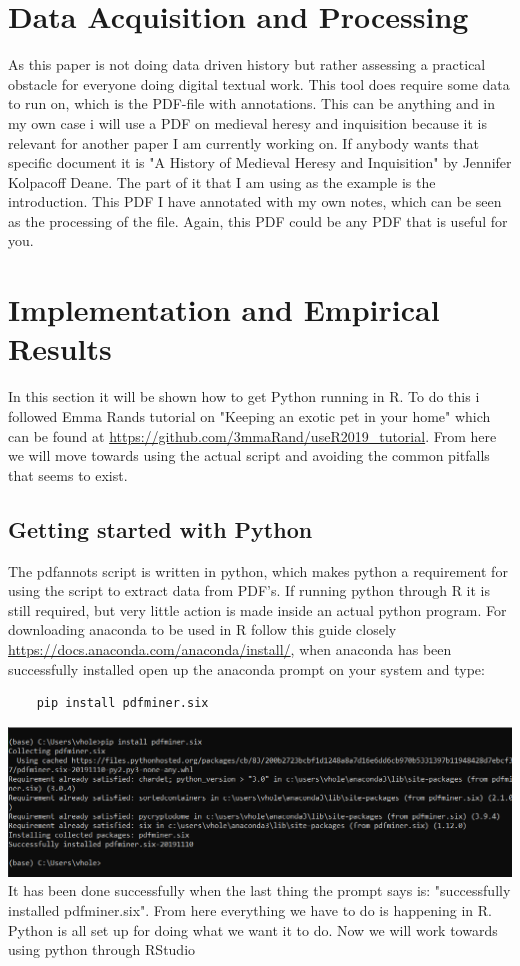 \documentclass{article}
\begin{document}
\section{Data Acquisition and Processing}
As this paper is not doing data driven history but rather assessing a practical obstacle for everyone doing digital textual work. This tool does require some data to run on, which is the PDF-file with annotations. This can be anything and in my own case i will use a PDF on medieval heresy and inquisition because it is relevant for another paper I am currently working on. If anybody wants that specific document it is "A History of Medieval Heresy and Inquisition" by Jennifer Kolpacoff Deane. The part of it that I am using as the example is the introduction. This PDF I have annotated with my own notes, which can be seen as the processing of the file. Again, this PDF could be any PDF that is useful for you.

\section{Implementation and Empirical Results}
In this section it will be shown how to get Python running in R. To do this i followed Emma Rands tutorial on "Keeping an exotic pet in your home" which can be found at \url{https://github.com/3mmaRand/useR2019_tutorial}. From here we will move towards using the actual script and avoiding the common pitfalls that seems to exist.  
\subsection{Getting started with Python}
The pdfannots script is written in python, which makes python a requirement for using the script to extract data from PDF’s. If running python through R it is still required, but very little action is made inside an actual python program. For downloading anaconda to be used in R follow this guide closely \url{https://docs.anaconda.com/anaconda/install/}, when anaconda has been successfully installed open up the anaconda prompt on your system and type: 
\begin{verbatim}
    pip install pdfminer.six
\end{verbatim}
\includegraphics[scale=0.53]{Install_pdfminer_six.PNG}\newline
It has been done successfully when the last thing the prompt says is: "successfully installed pdfminer.six". From here everything we have to do is happening in R. Python is all set up for doing what we want it to do. Now we will work towards using python through RStudio
\end{document}
